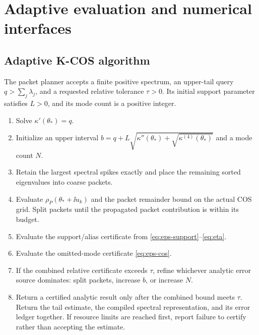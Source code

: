 \chapter{Adaptive evaluation and numerical interfaces}\label{ch:adaptive}
\section{Adaptive K-COS algorithm}

The packet planner accepts a finite positive spectrum, an upper-tail query
$q>\sum_j\lambda_j$, and a requested relative tolerance $\tau>0$.
Its initial support parameter satisfies $L>0$, and its mode count is a
positive integer.

\begin{enumerate}[leftmargin=2em]
\item Solve $\kappa'(\theta_*)=q$.
\item Initialize an upper interval $b=q+L\sqrt{\kappa''(\theta_*)+\sqrt{\kappa^{(4)}(\theta_*)}}$ and a mode count $N$.
\item Retain the largest spectral spikes exactly and place the remaining sorted eigenvalues into coarse packets.
\item Evaluate $\rho_P(\theta_*+\ii u_k)$ and the packet remainder bound on the actual COS grid. Split packets until the propagated packet contribution is within its budget.
\item Evaluate the support/alias certificate from \eqref{eq:eps-support}--\eqref{eq:eta}.
\item Evaluate the omitted-mode certificate \eqref{eq:eps-cos}.
\item If the combined relative certificate exceeds $\tau$, refine whichever analytic error source dominates: split packets, increase $b$, or increase $N$.
\item Return a certified analytic result only after the combined bound meets
$\tau$. Return the tail estimate, the compiled spectral representation,
and its error ledger together. If resource limits are reached first,
report failure to certify rather than accepting the estimate.
\end{enumerate}


